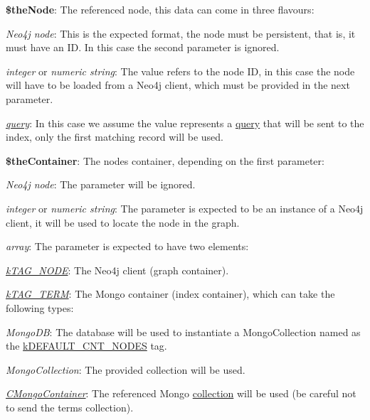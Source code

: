 \begin{DoxyItemize}
\item {\bfseries \$the\-Node}\-: The referenced node, this data can come in three flavours\-: 
\begin{DoxyItemize}
\item {\itshape Neo4j node}\-: This is the expected format, the node must be persistent, that is, it must have an I\-D. In this case the second parameter is ignored. 
\item {\itshape integer} or {\itshape numeric string}\-: The value refers to the node I\-D, in this case the node will have to be loaded from a Neo4j client, which must be provided in the next parameter. 
\item {\itshape \hyperlink{class_c_mongo_query}{query}}\-: In this case we assume the value represents a \hyperlink{class_c_mongo_query}{query} that will be sent to the index, only the first matching record will be used. 
\end{DoxyItemize}
\item {\bfseries \$the\-Container}\-: The nodes container, depending on the first parameter\-: 
\begin{DoxyItemize}
\item {\itshape Neo4j node}\-: The parameter will be ignored. 
\item {\itshape integer} or {\itshape numeric string}\-: The parameter is expected to be an instance of a Neo4j client, it will be used to locate the node in the graph. 
\item {\itshape array}\-: The parameter is expected to have two elements\-: 
\begin{DoxyItemize}
\item {\itshape \hyperlink{}{k\-T\-A\-G\-\_\-\-N\-O\-D\-E}}\-: The Neo4j client (graph container). 
\item {\itshape \hyperlink{}{k\-T\-A\-G\-\_\-\-T\-E\-R\-M}}\-: The Mongo container (index container), which can take the following types\-: 
\begin{DoxyItemize}
\item {\itshape Mongo\-D\-B}\-: The database will be used to instantiate a Mongo\-Collection named as the \hyperlink{}{k\-D\-E\-F\-A\-U\-L\-T\-\_\-\-C\-N\-T\-\_\-\-N\-O\-D\-E\-S} tag. 
\item {\itshape Mongo\-Collection}\-: The provided collection will be used. 
\item {\itshape \hyperlink{class_c_mongo_container}{C\-Mongo\-Container}}\-: The referenced Mongo \hyperlink{class_c_container_a7d10fa70dfa381cb95e66c265e2ca113}{collection} will be used (be careful not to send the terms collection). 
\end{DoxyItemize}
\end{DoxyItemize}
\end{DoxyItemize}
\end{DoxyItemize}

